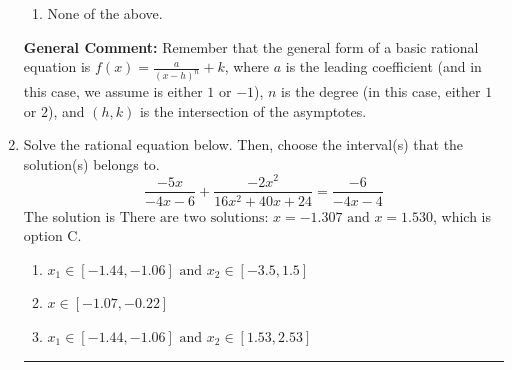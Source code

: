 \documentclass{extbook}[14pt]
\newcommand{\litem}[1]{\item #1

\rule{\textwidth}{0.4pt}}
\begin{document}
\begin{enumerate}
{\begin{enumerate}[label=\Alph*.]
\item None of the above.\end{enumerate}
\textbf{General Comment:} Remember that the general form of a basic rational equation is $ f(x) = \frac{a}{(x-h)^n} + k$, where $a$ is the leading coefficient (and in this case, we assume is either $1$ or $-1$), $n$ is the degree (in this case, either $1$ or $2$), and $(h, k)$ is the intersection of the asymptotes.
}
\litem{
Solve the rational equation below. Then, choose the interval(s) that the solution(s) belongs to.
\[ \frac{-5x}{-4x -6} + \frac{-2x^{2}}{16x^{2} +40 x + 24} = \frac{-6}{-4x -4} \]The solution is \( \text{There are two solutions: } x = -1.307 \text{ and } x = 1.530 \), which is option C.\begin{enumerate}[label=\Alph*.]
\item \( x_1 \in [-1.44, -1.06] \text{ and } x_2 \in [-3.5,1.5] \)


\item \( x \in [-1.07,-0.22] \)


\item \( x_1 \in [-1.44, -1.06] \text{ and } x_2 \in [1.53,2.53] \)


\end{enumerate}}
\end{enumerate}
\end{document}
